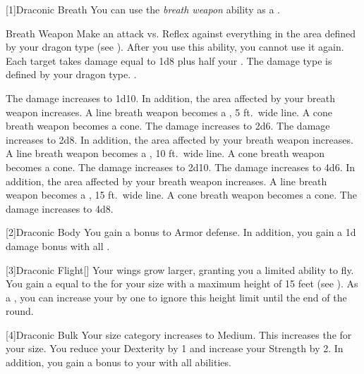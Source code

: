            [1]{Draconic Breath} You can use the \textit{breath weapon} ability as a .
            \begin{activeability}{Breath Weapon}
                \rankline
                Make an attack vs. Reflex against everything in the area defined by your dragon type (see ).
                After you use this ability, you  cannot use it again.
                \hit Each target takes damage equal to 1d8 plus half your .
                The damage type is defined by your dragon type.
                \miss {}.

                \rankline
                 The damage increases to 1d10.
                    In addition, the area affected by your breath weapon increases.
                    A line breath weapon becomes a \arealarge, 5 ft.\ wide line.
                    A cone breath weapon becomes a \areamed cone.
                 The damage increases to 2d6.
                 The damage increases to 2d8.
                    In addition, the area affected by your breath weapon increases.
                    A line breath weapon becomes a \areahuge, 10 ft.\ wide line.
                    A cone breath weapon becomes a \arealarge cone.
                 The damage increases to 2d10.
                 The damage increases to 4d6.
                    In addition, the area affected by your breath weapon increases.
                    A line breath weapon becomes a \areagarg, 15 ft.\ wide line.
                    A cone breath weapon becomes a \areahuge cone.
                 The damage increases to 4d8.
            \end{activeability}

            [2]{Draconic Body} You gain a  bonus to Armor defense.
            In addition, you gain a \plus1d damage bonus with all .

            [3]{Draconic Flight}[\sparkle] Your wings grow larger, granting you a limited ability to fly.
            You gain a  equal to the  for your size with a maximum height of 15 feet (see ).
            As a , you can increase your  by one to ignore this height limit until the end of the round.

            [4]{Draconic Bulk} Your size category increases to Medium.
            This increases the  for your size.
            You reduce your Dexterity by 1 and increase your Strength by 2.
            In addition, you gain a  bonus to your  with all abilities.

